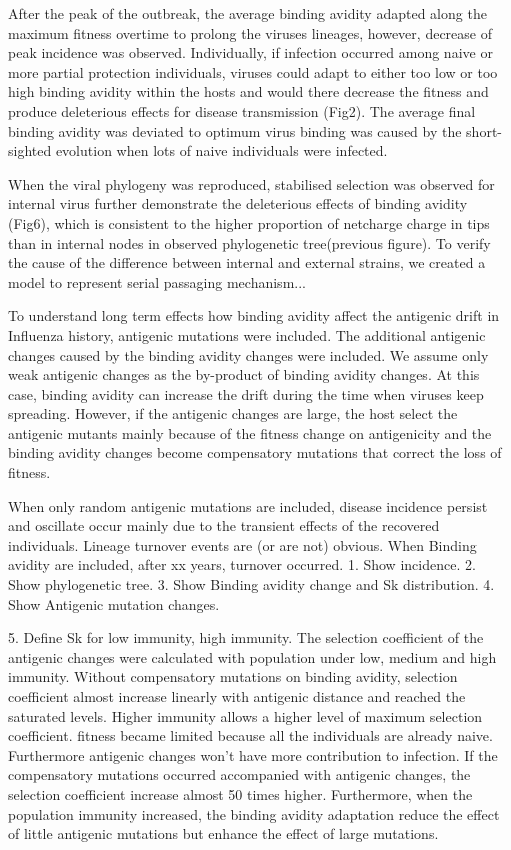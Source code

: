 \documentclass[12pt,a4paper]{article}
\begin{document}
After the peak of the outbreak, the average binding avidity adapted along the maximum fitness overtime to prolong the viruses lineages, however, decrease of peak incidence was observed. Individually, if infection occurred among naive or more partial protection individuals, viruses could adapt to either too low or too high binding avidity within the hosts and would there decrease the fitness and produce deleterious effects for disease transmission (Fig2). The average final binding avidity was deviated to optimum virus binding was caused by the short-sighted evolution  when lots of naive individuals were infected.

When the viral phylogeny was reproduced, stabilised selection was observed for internal virus further demonstrate the deleterious effects of binding avidity  (Fig6), which is consistent to the higher proportion of netcharge charge in tips than in internal nodes in observed phylogenetic tree(previous figure). To verify the cause of the difference between internal and external strains, we created a model to represent serial passaging mechanism... 

 

   
To understand long term effects how binding avidity affect the antigenic drift in Influenza history, antigenic mutations were included. The additional antigenic changes caused by the binding avidity changes were included. We assume only weak antigenic changes as the by-product of binding avidity changes. At this case, binding avidity can increase the drift during the time when viruses keep spreading. However, if the antigenic changes are large, the host select the antigenic mutants mainly because of the fitness change on antigenicity and the binding avidity changes become compensatory mutations that correct the loss of fitness.

When only random antigenic mutations are included, disease incidence persist and oscillate occur mainly due to the transient effects of the recovered individuals. Lineage turnover events are (or are not) obvious.  When Binding avidity are included, after xx years, turnover occurred. 
1. Show incidence.
2. Show phylogenetic tree.
3. Show Binding avidity change and Sk distribution.
4. Show Antigenic mutation changes.

5. Define Sk for low immunity, high immunity.
The selection coefficient of the antigenic changes were calculated with population under low, medium and high immunity. Without compensatory mutations on binding avidity, selection coefficient almost increase linearly with antigenic distance and reached the saturated levels. Higher immunity allows a higher level of maximum selection coefficient. fitness became limited because all the individuals are already naive. Furthermore antigenic changes won't have more contribution to infection. If the compensatory mutations occurred accompanied with antigenic changes, the selection coefficient increase almost 50 times higher. Furthermore, when the population immunity increased, the binding avidity adaptation reduce the effect of little antigenic mutations but enhance the effect of large mutations. 
\end{document}
